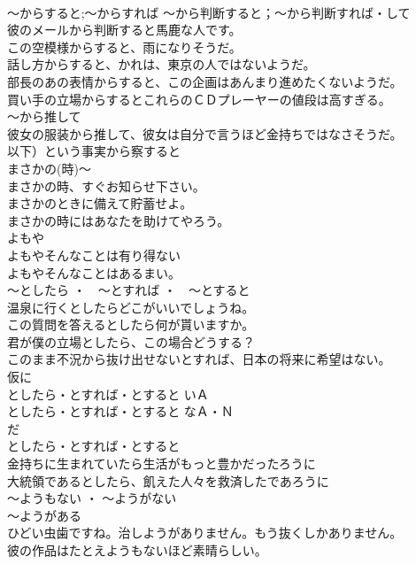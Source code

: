 \documentclass[8pt]{extreport}
\begin{document}
\begin{CJK}{UTF8}{min}
\\	～からすると;～からすれば ～から判断すると；～から判断すれば・して	
\\	彼のメールから判断すると馬鹿な人です。
\\	この空模様からすると、雨になりそうだ。 
\\	話し方からすると、かれは、東京の人ではないようだ。 
\\	部長のあの表情からすると、この企画はあんまり進めたくないようだ。 
\\	買い手の立場からするとこれらのＣＤプレーヤーの値段は高すぎる。 
\\	～から推して 
\\	彼女の服装から推して、彼女は自分で言うほど金持ちではなさそうだ。 
\\	以下）という事実から察すると
\\	まさかの(時)～	
\\	まさかの時、すぐお知らせ下さい。 
\\	まさかのときに備えて貯蓄せよ。 
\\	まさかの時にはあなたを助けてやろう。 
\\	よもや 
\\	よもやそんなことは有り得ない 
\\	よもやそんなことはあるまい。 
\\	～としたら ・　～とすれば ・　～とすると	
\\	温泉に行くとしたらどこがいいでしょうね。 
\\	この質問を答えるとしたら何が貰いますか。 
\\	君が僕の立場としたら、この場合どうする？ 
\\	このまま不況から抜け出せないとすれば、日本の将来に希望はない。 
\\	仮に 
\\	としたら・とすれば・とすると いＡ 
\\	としたら・とすれば・とすると なＡ・Ｎ 
\\	だ 
\\	としたら・とすれば・とすると	
\\	金持ちに生まれていたら生活がもっと豊かだったろうに 
\\	大統領であるとしたら、飢えた人々を救済したであろうに
\\	～ようもない ・ ～ようがない 
\\	～ようがある	
\\	ひどい虫歯ですね。治しようがありません。もう抜くしかありません。 
\\	彼の作品はたとえようもないほど素晴らしい。 

\end{CJK}
\end{document}
